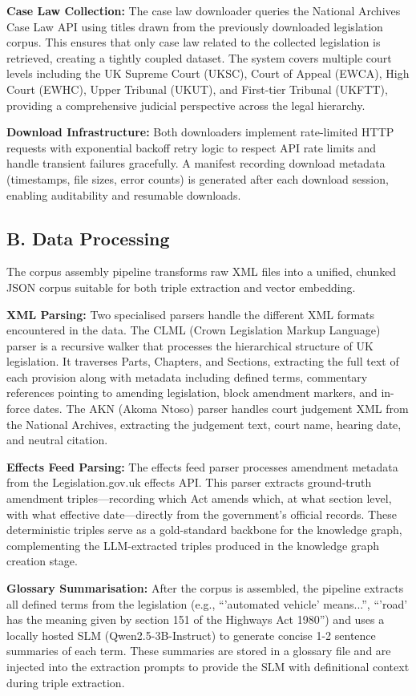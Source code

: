 \documentclass[10pt, a4paper, twocolumn]{article}
\begin{document}
\textbf{Case Law Collection:} The case law downloader queries the National Archives Case Law API using titles drawn from the previously downloaded legislation corpus. This ensures that only case law related to the collected legislation is retrieved, creating a tightly coupled dataset. The system covers multiple court levels including the UK Supreme Court (UKSC), Court of Appeal (EWCA), High Court (EWHC), Upper Tribunal (UKUT), and First-tier Tribunal (UKFTT), providing a comprehensive judicial perspective across the legal hierarchy.

\textbf{Download Infrastructure:} Both downloaders implement rate-limited HTTP requests with exponential backoff retry logic to respect API rate limits and handle transient failures gracefully. A manifest recording download metadata (timestamps, file sizes, error counts) is generated after each download session, enabling auditability and resumable downloads.

\subsection{B. Data Processing}
The corpus assembly pipeline transforms raw XML files into a unified, chunked JSON corpus suitable for both triple extraction and vector embedding.

\textbf{XML Parsing:} Two specialised parsers handle the different XML formats encountered in the data. The CLML (Crown Legislation Markup Language) parser is a recursive walker that processes the hierarchical structure of UK legislation. It traverses Parts, Chapters, and Sections, extracting the full text of each provision along with metadata including defined terms, commentary references pointing to amending legislation, block amendment markers, and in-force dates. The AKN (Akoma Ntoso) parser handles court judgement XML from the National Archives, extracting the judgement text, court name, hearing date, and neutral citation.

\textbf{Effects Feed Parsing:} The effects feed parser processes amendment metadata from the Legislation.gov.uk effects API. This parser extracts ground-truth amendment triples—recording which Act amends which, at what section level, with what effective date—directly from the government's official records. These deterministic triples serve as a gold-standard backbone for the knowledge graph, complementing the LLM-extracted triples produced in the knowledge graph creation stage.

\textbf{Glossary Summarisation:} After the corpus is assembled, the pipeline extracts all defined terms from the legislation (e.g., ``'automated vehicle' means...'', ``'road' has the meaning given by section 151 of the Highways Act 1980'') and uses a locally hosted SLM (Qwen2.5-3B-Instruct) to generate concise 1-2 sentence summaries of each term. These summaries are stored in a glossary file and are injected into the extraction prompts to provide the SLM with definitional context during triple extraction.
\end{document}
